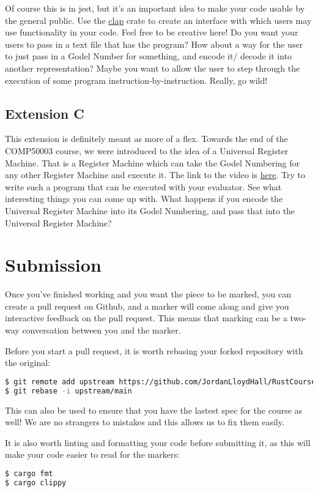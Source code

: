 \documentclass{report}
\begin{document}
Of course this is in jest, but it's an important idea to make your code usable by
the general public.
Use the \href{https://github.com/clap-rs/clap}{clap} crate to create an interface
with which users may use functionality in your code. Feel free to be creative here!
Do you want your users to pass in a text file that has the program? How about a way
for the user to just pass in a Godel Number for something, and encode it/
decode it into another representation? Maybe you want to allow the user to step 
through the execution of some program instruction-by-instruction. Really, go wild!

\subsection*{Extension C}
This extension is definitely meant as more of a flex. Towards the end of the
COMP50003 course, we were introduced to the idea of a Universal Register Machine.
That is a Register Machine which can take the Godel Numbering for any other Register
Machine and execute it. The link to the video is 
\href{https://imperial.cloud.panopto.eu/Panopto/Pages/Viewer.aspx?id=d3732fc3-0d12-40be-9e41-aded00929300}{here}.
Try to write such a program that can be executed with your evaluator. See what interesting
things you can come up with. What happens if you encode the Universal Register Machine
into its Godel Numbering, and pass that into the Universal Register Machine?

\section*{Submission}
Once you've finished working and you want the piece to be marked, you can create 
a pull request on Github, and a marker will come along and give you interactive
feedback on the pull request. This means that marking can be a two-way conversation
between you and the marker.

Before you start a pull request, it is worth rebasing your forked repository with
the original:
\begin{lstlisting}[language=Bash]
$ git remote add upstream https://github.com/JordanLloydHall/RustCourse
$ git rebase -i upstream/main
\end{lstlisting}

This can also be used to ensure that you have the lastest spec for the course as well! 
We are no strangers to mistakes and this allows us to fix them easily.

It is also worth linting and formatting your code before submitting it, as this will make your code
easier to read for the markers:
\begin{lstlisting}[language=Bash]
$ cargo fmt
$ cargo clippy
\end{lstlisting}
\end{document}

